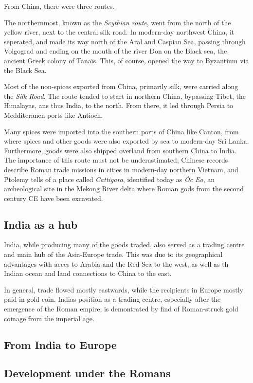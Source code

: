 \documentclass[11pt, a4paper]{scrreprt}
\begin{document}
From China, there were three routes.

The northernmost, known as the \emph{Scythian route}, went from the north of the yellow river, next to the central silk road. In modern-day northwest China, it seperated, and made its way north of the Aral and Caspian Sea, passing through Volgograd and ending on the mouth of the river Don on the Black sea, the ancient Greek colony of Tana\"{i}s. This, of course, opened the way to Byzantium via the Black Sea.

Most of the non-spices exported from China, primarily silk, were carried along the \emph{Silk Road}. The route tended to start in northern China, bypassing Tibet, the Himalayas, ans thus India, to the north. From there, it led through Persia to Medditeranen ports like Antioch.

Many spices were imported into the southern ports of China like Canton, from where spices and other goods were also exported by sea to modern-day Sri Lanka. Furthermore, goods were also shipped overland from southern China to India. The importance of this route must not be underastimated; Chinese records describe Roman trade missions in cities in modern-day northern Vietnam, and Ptolemy tells of a place called \emph{Cattigara}, identified today as \emph{\'{O}c Eo}, an archeological site in the Mekong River delta where Roman gods from the second century CE have been excavated.

\subsection{India as a hub}
India, while producing many of the goods traded, also served as a trading centre and main hub of the Asia-Europe trade. This was due to its geographical advantages with acces to Arabia and the Red Sea to the west, as well as th Indian ocean and land connections to China to the east.

In general, trade flowed mostly eastwards, while the recipients in Europe mostly paid in gold coin. Indias position as a trading centre, especially after the emergence of the Roman empire, is demontrated by find of Roman-struck gold coinage from the imperial age.

\subsection{From India to Europe}


\subsection{Development under the Romans}
\end{document}
